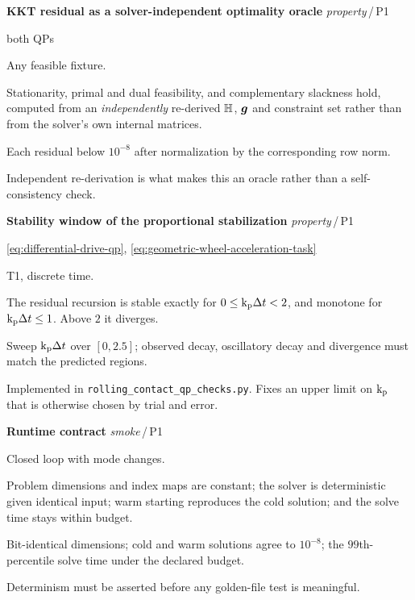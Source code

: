 \documentclass[10pt]{article}
\newcommand{\harness}{\texttt{rolling\_contact\_qp\_checks.py}\xspace}
\newenvironment{testcard}[4]{%
  \par\medskip\noindent
  \tBlock{#1}\quad\textbf{#2}%
  \hfill{\small\textit{#3}\,/\,#4}\par\nopagebreak\vspace{2pt}
  \begin{description}[leftmargin=7.5em,style=sameline,itemsep=1pt,topsep=1pt]
}{%
  \end{description}\par\medskip
}
\begin{document}
\begin{testcard}{QP-07}{KKT residual as a solver-independent optimality oracle}{property}{P1}
  \item[Targets] both QPs
  \item[Regime] Any feasible fixture.
  \item[Invariant] Stationarity, primal and dual feasibility, and complementary
    slackness hold, computed from an \emph{independently} re-derived
    $\mathbb{H}$, $\boldsymbol{g}$ and constraint set rather than from the
    solver's own internal matrices.
  \item[Pass] Each residual below $10^{-8}$ after normalization by the
    corresponding row norm.
  \item[Diagnosis] Independent re-derivation is what makes this an oracle
    rather than a self-consistency check.
\end{testcard}

\begin{testcard}{QP-08}{Stability window of the proportional stabilization}{property}{P1}
  \item[Targets] \eqref{eq:differential-drive-qp},
    \eqref{eq:geometric-wheel-acceleration-task}
  \item[Regime] T1, discrete time.
  \item[Invariant] The residual recursion is stable exactly for
    $0\leq\text{k}_{\text{p}}\Delta t<2$, and monotone for
    $\text{k}_{\text{p}}\Delta t\leq1$. Above $2$ it diverges.
  \item[Pass] Sweep $\text{k}_{\text{p}}\Delta t$ over $[0,2.5]$; observed decay,
    oscillatory decay and divergence must match the predicted regions.
  \item[Diagnosis] Implemented in \harness. Fixes an upper limit on $\text{k}_{\text{p}}$
    that is otherwise chosen by trial and error.
\end{testcard}

\begin{testcard}{QP-09}{Runtime contract}{smoke}{P1}
  \item[Targets] 
  \item[Regime] Closed loop with mode changes.
  \item[Invariant] Problem dimensions and index maps are constant; the solver
    is deterministic given identical input; warm starting reproduces the cold
    solution; and the solve time stays within budget.
  \item[Pass] Bit-identical dimensions; cold and warm solutions agree to
    $10^{-8}$; the $99$th-percentile solve time under the declared budget.
  \item[Diagnosis] Determinism must be asserted before any golden-file test is
    meaningful.
\end{testcard}
\end{document}
